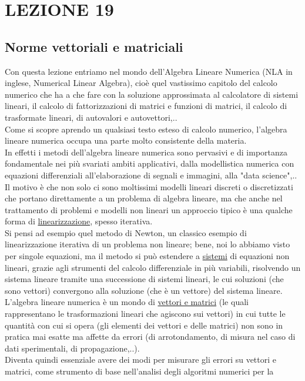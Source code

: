 \documentclass[12pt,a4paper]{article}
\begin{document}
\section*{LEZIONE 19}
\subsection*{Norme vettoriali e matriciali}

Con questa lezione entriamo nel mondo dell'Algebra Lineare Numerica (NLA in inglese, Numerical Linear Algebra), cioè quel vastissimo capitolo del calcolo numerico che ha a che fare con la soluzione approssimata al calcolatore di sistemi lineari, il calcolo di fattorizzazioni di matrici
e funzioni di matrici, il calcolo di trasformate lineari, di autovalori e autovettori,..\\Come si scopre aprendo un qualsiasi testo esteso di calcolo numerico, l'algebra lineare numerica occupa una parte molto consistente della materia.\\In effetti i metodi dell'algebra lineare numerica sono pervasivi e di importanza fondamentale nei più svariati ambiti applicativi, dalla modellistica numerica con equazioni differenziali all'elaborazione di
segnali e immagini, alla "data science",..\\Il motivo è che non solo ci sono moltissimi modelli lineari discreti o discretizzati che portano direttamente a un problema di algebra lineare, ma che anche nel trattamento di problemi e modelli non lineari un approccio tipico è una qualche forma di \underline{linearizzazione}, spesso iterativa.\\Si pensi ad esempio quel metodo di Newton, un classico esempio di linearizzazione iterativa di un problema non lineare; bene,
noi lo abbiamo visto per singole equazioni, ma il metodo si può estendere a \underline{sistemi} di equazioni non lineari, grazie agli strumenti del calcolo differenziale in più variabili, risolvendo un sistema lineare tramite una successione di sistemi lineari, le cui soluzioni (che sono vettori) convergono alla soluzione (che è un vettore) del sistema lineare.\\L'algebra lineare numerica è un mondo di \underline{vettori e matrici}
(le quali rappresentano  le trasformazioni lineari che agiscono sui vettori) in cui tutte le quantità con cui si opera (gli elementi dei vettori e delle matrici) non sono in pratica mai esatte ma affette da errori (di arrotondamento, di misura nel caso di dati sperimentali, di propagazione,..).\\Diventa quindi essenziale avere dei modi per misurare gli errori su vettori e matrici, come strumento di base nell'analisi degli algoritmi numerici per la
\end{document}
